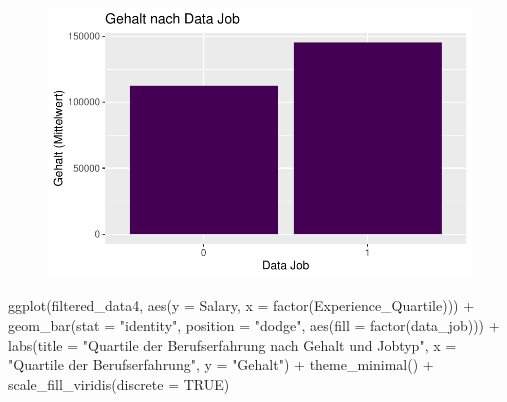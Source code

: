\documentclass[
  letterpaper,
  DIV=11,
  numbers=noendperiod]{scrartcl}
\newenvironment{Shaded}{\begin{snugshade}}{\end{snugshade}}
\newcommand{\AttributeTok}[1]{\textcolor[rgb]{0.40,0.45,0.13}{#1}}
\newcommand{\ConstantTok}[1]{\textcolor[rgb]{0.56,0.35,0.01}{#1}}
\newcommand{\FunctionTok}[1]{\textcolor[rgb]{0.28,0.35,0.67}{#1}}
\newcommand{\NormalTok}[1]{\textcolor[rgb]{0.00,0.23,0.31}{#1}}
\newcommand{\SpecialCharTok}[1]{\textcolor[rgb]{0.37,0.37,0.37}{#1}}
\newcommand{\StringTok}[1]{\textcolor[rgb]{0.13,0.47,0.30}{#1}}
\begin{document}
\begin{figure}[H]

{\centering \includegraphics{main_doc_files/figure-pdf/unnamed-chunk-90-1.pdf}

}

\end{figure}

\begin{Shaded}
\begin{Highlighting}[]
\FunctionTok{ggplot}\NormalTok{(filtered\_data4, }\FunctionTok{aes}\NormalTok{(}\AttributeTok{y =}\NormalTok{ Salary, }\AttributeTok{x =} \FunctionTok{factor}\NormalTok{(Experience\_Quartile))) }\SpecialCharTok{+}
  \FunctionTok{geom\_bar}\NormalTok{(}\AttributeTok{stat =} \StringTok{"identity"}\NormalTok{, }\AttributeTok{position =} \StringTok{"dodge"}\NormalTok{, }\FunctionTok{aes}\NormalTok{(}\AttributeTok{fill =} \FunctionTok{factor}\NormalTok{(data\_job))) }\SpecialCharTok{+}
  \FunctionTok{labs}\NormalTok{(}\AttributeTok{title =} \StringTok{"Quartile der Berufserfahrung nach Gehalt und Jobtyp"}\NormalTok{,}
       \AttributeTok{x =} \StringTok{"Quartile der Berufserfahrung"}\NormalTok{,}
       \AttributeTok{y =} \StringTok{"Gehalt"}\NormalTok{) }\SpecialCharTok{+}
  \FunctionTok{theme\_minimal}\NormalTok{() }\SpecialCharTok{+}
  \FunctionTok{scale\_fill\_viridis}\NormalTok{(}\AttributeTok{discrete =} \ConstantTok{TRUE}\NormalTok{)}
\end{Highlighting}
\end{Shaded}
\end{document}
